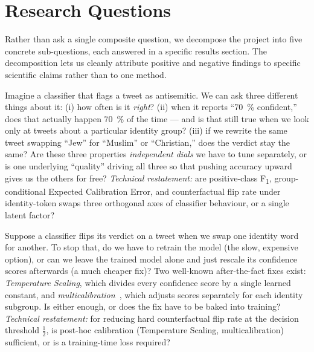\documentclass[10pt,a4paper]{article}
\begin{document}
\section{Research Questions}

Rather than ask a single composite question, we decompose the project into
five concrete sub-questions, each answered in a specific results section.
The decomposition lets us cleanly attribute positive and negative findings
to specific scientific claims rather than to one method.

\begin{description}[leftmargin=*,itemsep=4pt]
    \item[\textbf{RQ1 (are these three qualities really separate? \S\ref{sec:results-id})}]
    Imagine a classifier that flags a tweet as antisemitic. We can ask three
    different things about it: (i) how often is it \emph{right}? (ii) when it
    reports ``70~\% confident,'' does that actually happen 70~\% of the time
    --- and is that still true when we look only at tweets about a particular
    identity group? (iii) if we rewrite the same tweet swapping ``Jew'' for
    ``Muslim'' or ``Christian,'' does the verdict stay the same? Are these
    three properties \emph{independent dials} we have to tune separately,
    or is one underlying ``quality'' driving all three so that pushing
    accuracy upward gives us the others for free? \emph{Technical
    restatement:} are positive-class F\textsubscript{1}, group-conditional
    Expected Calibration Error, and counterfactual flip rate under
    identity-token swaps three orthogonal axes of classifier behaviour, or
    a single latent factor?

    \item[\textbf{RQ2 (fix it during training, or patch it afterwards? \S\ref{sec:lemma}--\ref{sec:tension})}]
    Suppose a classifier flips its verdict on a tweet when we swap one
    identity word for another. To stop that, do we have to retrain the model
    (the slow, expensive option), or can we leave the trained model alone
    and just rescale its confidence scores afterwards (a much cheaper fix)?
    Two well-known after-the-fact fixes exist: \emph{Temperature Scaling},
    which divides every confidence score by a single learned constant, and
    \emph{multicalibration}~\citep{hebertjohnson2018multicalibration}, which
    adjusts scores separately for each identity subgroup. Is either enough,
    or does the fix have to be baked into training? \emph{Technical
    restatement:} for reducing hard counterfactual flip rate at the
    decision threshold $\tfrac{1}{2}$, is post-hoc calibration (Temperature
    Scaling, multicalibration) sufficient, or is a training-time loss
    required?


\end{description}
\end{document}
